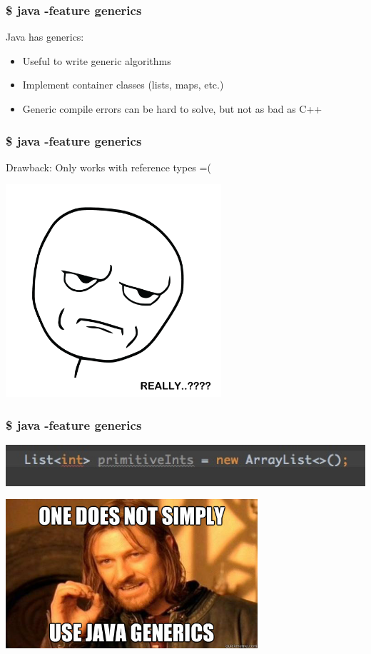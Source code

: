 \begin{frame}
  \frametitle{\$ java -feature generics}
  Java has generics:
  \vspace{0.25cm}
  \begin{itemize}
    \item Useful to write generic algorithms
    \vspace{0.4cm}
    \item Implement container classes (lists, maps, etc.)   
    \vspace{0.4cm}
    \item Generic compile errors can be hard to solve, but not as bad as C++
  \end{itemize}
\end{frame}


\begin{frame}
  \frametitle{\$ java -feature generics}
  Drawback: Only works with reference types =(
  \vspace{0.25cm}
  \begin{center}
  \includegraphics[width=0.6\textwidth]{fig/primitives}    
  \end{center}
\end{frame}


\begin{frame}
  \frametitle{\$ java -feature generics}
	\begin{center}
	    \includegraphics[width=1\textwidth]{fig/primarray}    
	\end{center}
	\begin{center}
	    \includegraphics[width=0.7\textwidth]{fig/donotusegenerics}    
	\end{center}
\end{frame}


